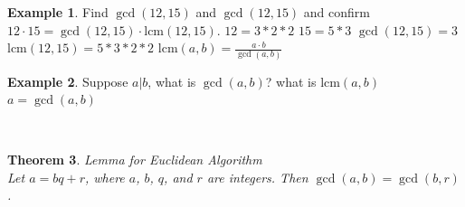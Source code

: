 \documentclass[letterpaper,10pt]{article}
\theoremstyle{plain}
\newtheorem{thm}{Theorem}[section]
\theoremstyle{definition}
\newtheorem{exmp}[thm]{Example}
\theoremstyle{remark}
\providecommand{\lcm}{\ensuremath{\text{lcm}}}%
\begin{document}
\begin{exmp}
Find $\gcd(12,15)$ and $\gcd(12,15)$ and  confirm $12\cdot15 = \gcd(12, 15) \cdot \lcm(12, 15)$.
\newline
$12=3*2*2$\newline
$15=5*3$\newline
$\gcd(12,15)=3$\newline
$\lcm(12,15)=5*3*2*2$\newline
\newline
$\lcm(a,b)=\frac{a\cdot b}{\gcd(a,b)}$


\end{exmp}
\begin{exmp}Suppose $a|b$, what is $\gcd(a,b)$? what is $\lcm(a,b)$
$ $\\
$a=\gcd(a,b)$\\

\end{exmp}
\
\begin{thm}{Lemma for Euclidean Algorithm}$ $\\
Let $a = bq + r$, where $a$, $b$, $q$, and $r$ are integers. Then $\gcd(a, b) = \gcd(b, r)$.

\end{thm}
\end{document}
